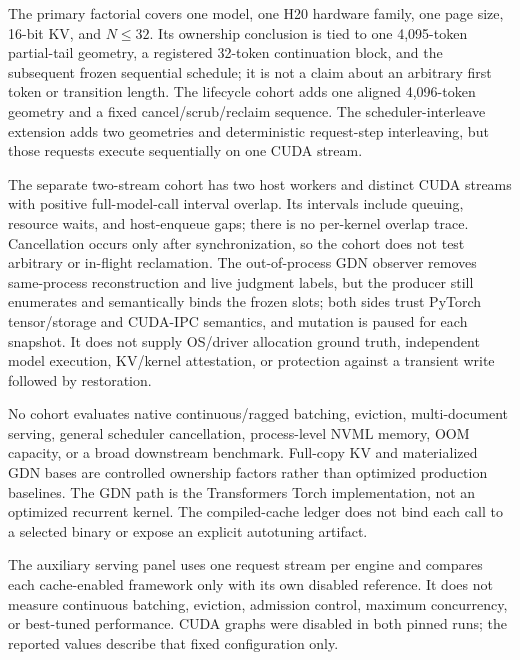 \documentclass{article}
\begin{document}
The primary factorial covers one model, one H20 hardware family, one page
size, 16-bit KV, and $N\leq32$.  Its ownership conclusion is tied to one
4,095-token partial-tail geometry, a registered 32-token continuation block,
and the subsequent frozen sequential schedule; it is not a claim about an
arbitrary first token or transition length.  The lifecycle cohort adds one
aligned 4,096-token geometry and a fixed cancel/scrub/reclaim sequence.  The
scheduler-interleave extension adds two geometries and deterministic
request-step interleaving, but those requests execute sequentially on one CUDA
stream.

The separate two-stream cohort has two host workers and distinct CUDA streams
with positive full-model-call interval overlap.  Its intervals include
queuing, resource waits, and host-enqueue gaps; there is no per-kernel overlap
trace.  Cancellation occurs only after synchronization, so the cohort does not
test arbitrary or in-flight reclamation.  The out-of-process GDN observer
removes same-process reconstruction and live judgment labels, but the producer
still enumerates and semantically binds the frozen slots; both sides trust
PyTorch tensor/storage and CUDA-IPC semantics, and mutation is paused for each
snapshot.  It does not supply OS/driver allocation ground truth, independent
model execution, KV/kernel attestation, or protection against a transient
write followed by restoration.

No cohort evaluates native continuous/ragged batching, eviction,
multi-document serving, general scheduler cancellation, process-level NVML
memory, OOM capacity, or a broad downstream benchmark.  Full-copy KV and
materialized GDN bases are controlled ownership factors rather than optimized
production baselines.  The GDN path is the Transformers Torch implementation,
not an optimized recurrent kernel.  The compiled-cache ledger does not bind
each call to a selected binary or expose an explicit autotuning artifact.

The auxiliary serving panel uses one request stream per engine and compares
each cache-enabled framework only with its own disabled reference.  It does not
measure continuous batching, eviction, admission control, maximum concurrency,
or best-tuned performance.  CUDA graphs were disabled in both pinned runs; the
reported values describe that fixed configuration only.
\end{document}
